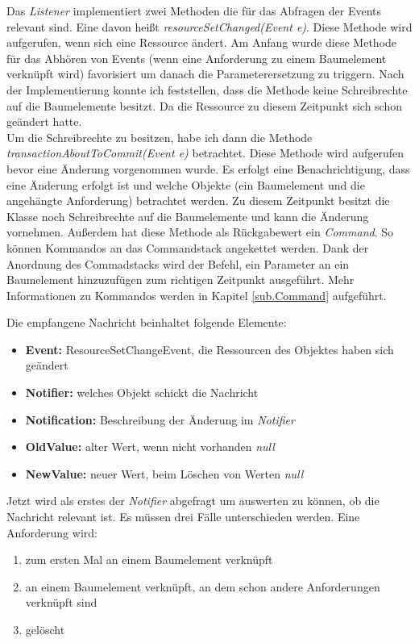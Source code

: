 Das \textit{Listener} implementiert zwei Methoden die für das Abfragen der Events relevant sind. Eine davon heißt \textit{resourceSetChanged(Event e)}. Diese Methode wird aufgerufen, wenn sich eine Ressource ändert. Am Anfang wurde diese Methode  für das Abhören von Events (wenn eine Anforderung zu einem Baumelement verknüpft wird) favorisiert um danach die Parameterersetzung zu triggern. Nach der Implementierung konnte ich feststellen, dass die Methode keine Schreibrechte auf die Baumelemente besitzt. Da die Ressource zu diesem Zeitpunkt sich schon geändert hatte.\\


Um die Schreibrechte zu besitzen, habe ich dann die Methode \textit{transactionAboutToCommit(Event e)} betrachtet. Diese Methode wird aufgerufen bevor eine Änderung vorgenommen wurde. Es erfolgt eine Benachrichtigung, dass eine Änderung erfolgt ist und welche Objekte (ein Baumelement und die angehängte Anforderung) betrachtet werden. Zu diesem Zeitpunkt besitzt die Klasse noch Schreibrechte auf die Baumelemente und kann die Änderung vornehmen. Außerdem hat diese Methode als Rückgabewert ein \textit{Command}. So können Kommandos an das Commandstack angekettet werden. Dank der Anordnung des Commadstacks wird der Befehl, ein Parameter an ein Baumelement hinzuzufügen zum richtigen Zeitpunkt ausgeführt. Mehr Informationen zu Kommandos werden in Kapitel \ref{sub.Command} aufgeführt.


Die empfangene Nachricht beinhaltet folgende Elemente: 

\begin{itemize}
\item \textbf{Event: }ResourceSetChangeEvent, die Ressourcen des Objektes haben sich geändert
\item \textbf{Notifier: } welches Objekt schickt die Nachricht
\item \textbf{Notification: }Beschreibung der Änderung im \textit{Notifier}
\item \textbf{OldValue: } alter Wert, wenn nicht vorhanden \textit{null}
\item \textbf{NewValue: } neuer Wert, beim Löschen von Werten \textit{null}
\end{itemize}


Jetzt wird als erstes der \textit{Notifier} abgefragt um auswerten zu können, ob die Nachricht relevant ist. Es müssen drei Fälle unterschieden werden. Eine Anforderung wird:


\begin{enumerate}
\item zum ersten Mal an einem Baumelement verknüpft
\item an einem Baumelement verknüpft, an dem schon andere Anforderungen verknüpft sind
\item gelöscht
\end{enumerate}


